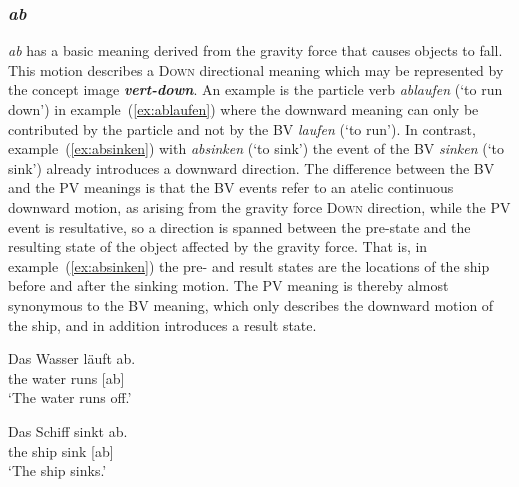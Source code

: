 \documentclass[output=paper]{langsci/langscibook}
\newcommand{\textci}[1]{\textit{\textbf{#1}}}
\begin{document}
\vspace{+1mm}
\subsubsection{\textit{ab}}

\textit{ab} has a basic meaning derived from the gravity force that
causes objects to fall. This motion describes a \textsc{Down}
directional meaning which may be represented by the concept image
\textci{vert-down}. An example is the particle verb \textit{ablaufen}
(`to run down') in example~(\ref{ex:ablaufen}) where the downward
meaning can only be contributed by the particle and not by the BV
\textit{laufen} (`to run'). In contrast, example~(\ref{ex:absinken})
with \textit{absinken} (`to sink')
the event of the BV \textit{sinken} (`to sink')
already introduces a downward direction. The difference between the BV
and the PV meanings is that the BV events refer to an atelic
continuous downward motion, as arising from the gravity force
\textsc{Down} direction, while the PV event is resultative, so a
direction is spanned between the pre-state and the resulting state of
the object affected by the gravity force. That is, in
example~(\ref{ex:absinken}) the pre- and result states are the
locations of the ship before and after the sinking motion. The PV
meaning is thereby almost synonymous to the BV meaning, which only
describes the downward motion of the ship, and in addition introduces
a result state.

\ea\label{ex:ablaufen}
\gll Das Wasser läuft ab.\\
the water runs [ab]\\
\glt `The water runs off.'
\z

\ea\label{ex:absinken}
\gll Das Schiff sinkt ab.\\
the ship sink [ab]\\
\glt `The ship sinks.'
\z
  
\end{document}
